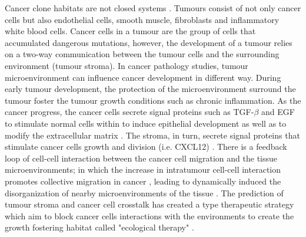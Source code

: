 Cancer clone habitats are not closed systems \cite{greaves2012clonal}. Tumours consist of not only cancer cells but also endothelial cells, smooth muscle, fibroblasts and inflammatory white blood cells. Cancer cells in a tumour are the group of cells that accumulated dangerous mutations, however, the development of a tumour relies on a two-way communication between the tumour cells and the surrounding environment (tumour stroma). In cancer pathology studies, tumour microenvironment can influence cancer development in different way. During early tumour development, the protection of the microenvironment surround the tumour foster the tumour growth conditions such as chronic inflammation. As the cancer progress, the cancer cells secrete signal proteins such as TGF-$\beta$ and EGF to stimulate normal cells within to induce epithelial development as well as to modify the extracellular matrix \cite{beck2011systematic,BREMNES2011209}. The stroma, in turn, secrete signal proteins that stimulate cancer cells growth and division (i.e. CXCL12) \cite{kumar2018analysis,wang2017role}. There is a feedback loop of cell-cell interaction between the cancer cell migration and the tissue microenvironments; in which the increase in intratumour cell-cell interaction promotes collective migration in cancer \cite{friedl2011cancer, whiteside2008tumor}, leading to dynamically induced the disorganization of nearby microenvironments of the tissue \cite{friedl2012classifying, canel2013cadherin, almendro2013cellular, roussos2011chemotaxis, zervantonakis2012three}. The prediction of tumour stroma and cancer cell crosstalk has created a type therapeutic strategy which aim to block cancer cells interactions with the environments to create the growth fostering habitat called "ecological therapy" \cite{pienta2008ecological, calabrese2007perivascular, bissell2011don}.      

